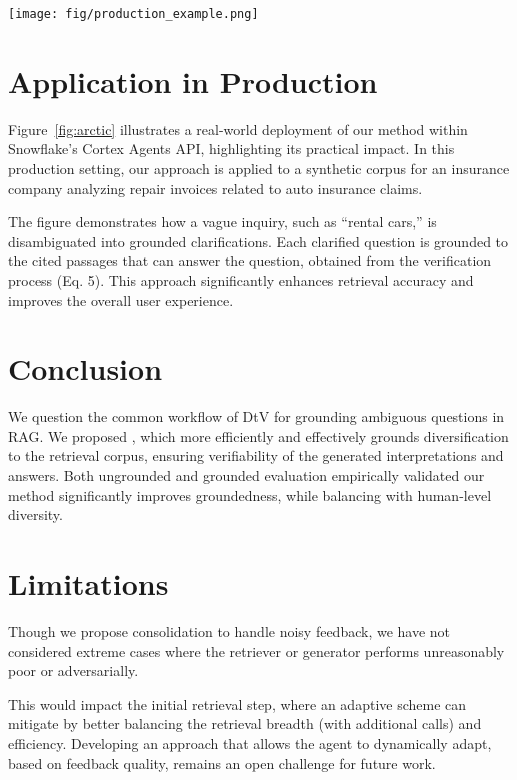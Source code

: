 \begin{figure*}[!ht]
\centering
\texttt{[image: fig/production\_example.png]}
\caption{Query clarification in Snowflake’s Cortex Agents API setup with tool access to a series of synthetically generated insurance documents retrieved via Cortex Search services.}
\label{fig:arctic}
\end{figure*}


\section{Application in Production }

Figure~\ref{fig:arctic} illustrates a real-world deployment of our method within Snowflake’s Cortex Agents API, highlighting its practical impact. In this production setting, our approach is applied to a synthetic corpus for an insurance company analyzing repair invoices related to auto insurance claims.

The figure demonstrates how a vague inquiry, such as “rental cars,” is disambiguated into grounded clarifications. Each clarified question is grounded to the  cited passages
that can answer the question, obtained from the verification process (Eq. 5). This approach significantly enhances retrieval accuracy and improves the overall user experience.




\section{Conclusion}

We question the common workflow of DtV for grounding ambiguous questions in RAG.
We proposed \ours,
which more efficiently and effectively
grounds diversification to the retrieval corpus, ensuring verifiability of the generated interpretations and answers.
Both ungrounded and grounded evaluation empirically validated our method significantly improves groundedness, while balancing with human-level diversity.






\section*{Limitations}

Though we propose consolidation to handle noisy feedback, we have not considered extreme cases  where the retriever or generator performs unreasonably poor or adversarially.

This would impact the initial retrieval step, where an adaptive scheme can mitigate by better balancing the retrieval breadth (with additional calls) and efficiency.
Developing an approach that allows the agent to dynamically adapt, based on feedback quality, remains an open challenge for future work.
